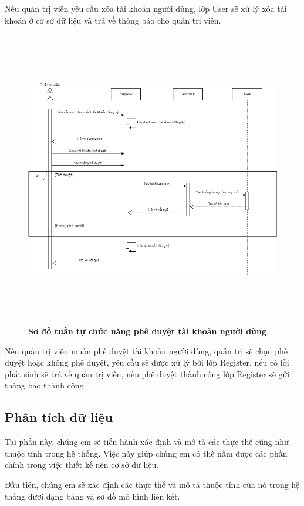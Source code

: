 Nếu quản trị viên yêu cầu xóa tài khoản người dùng, lớp User sẽ xử lý xóa tài khoản ở cơ sở dữ liệu và trả về thông báo cho quản trị viên.
\begin{figure}[H]
  \centering
  \includegraphics[width=14.5cm,height=13cm]{Images/sequence/sequence_manage_register.png}
  \caption[Sơ đồ tuần tự chức năng phê duyệt tài khoản người dùng]{\bfseries \fontsize{12pt}{0pt}
  \selectfont Sơ đồ tuần tự chức năng phê duyệt tài khoản người dùng}
  \label{sequence_manage_register} %
\end{figure}
Nếu quản trị viên muốn phê duyệt tài khoản người dùng, quản trị sẽ chọn phê duyệt hoặc không phê duyệt, yêu cầu sẽ được xử lý bởi lớp Register, nếu có lỗi phát sinh sẽ trả về quản trị viên,
nếu phê duyệt thành công lớp Register sẽ gửi thông báo thành công. 

\subsection{Phân tích dữ liệu}

Tại phần này, chúng em sẽ tiến hành xác định và mô tả các thực thể cũng như
 thuộc tính trong hệ thống. Việc này giúp chúng em có thể nắm được các phần chính 
 trong việc thiết kế nên cơ sở dữ liệu.

     Đầu tiên, chúng em sẽ xác định các thực thể và mô tả thuộc tính của nó trong hệ
      thống dươi dạng bảng và sơ đồ mô hình liên kết. 

